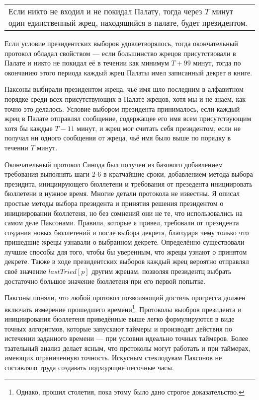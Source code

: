 \documentclass[12pt, a4paper]{article} %
\begin{document}
\begin{table}[h]
\begin{tabular}{p{11cm}}
    Если никто не входил и не покидал Палату, тогда через $T$ минут один единственный жрец, находящийся в палате, будет президентом.
\end{tabular}
\end{table}

Если условие президентских выборов удовлетворялось, тогда окончательный протокол обладал свойством --- если большинство жрецов присутствовали в Палате и никто не покидал её в течении как минимум $T + 99$ минут, тогда по окончанию этого периода каждый жрец Палаты имел записанный декрет в книге.

Паксоны выбирали президентом жреца, чьё имя шло последним в алфавитном порядке среди всех присутствующих в Палате жрецов, хотя мы и не знаем, как точно это делалось. Условие выбором президента принималось, если каждый жрец в Палате отправлял сообщение, содержащее его имя всем присутствующим хотя бы каждые $T - 11$ минут, и жрец мог считать себя президентом, если не получал ни одного сообщения от жреца, чьё имя было выше по порядку в течении $T$ минут.

Окончательный протокол Синода был получен из базового добавлением требования выполнять шаги 2-6 в кратчайшие сроки, добавлением метода выбора президнта, инициирующего бюллетени и требования от презедента инициировать бюллетени в нужное время. Многие детали протокола не известны. Я описал простые методы выбора президента и принятия решения президентом о инициировании бюллетеня, но без сомнений они не те, что использовались на самом деле Паксонами. Правила, которые я привел, требовали от президента создания новых бюллетений и после выбора декрета, благодаря чему только что пришедшие жрецы узнавали о выбранном декрете. Определённо существовали лучшие способы для того, чтобы бы уверенным, что жрецы узнают о принятом декрете. Также в ходе президентских выборов каждый жрец вероятно отправлял своё значение $lastTried[p]$  другим жрецам, позволяя президентц выбрать достаточно большое значение бюллетеня при его первой попытке.

Паксоны поняли, что любой протокол позволяющий достичь прогресса должен включать измерение прошедшего времени\footnote{Однако, прошил столетия, пока этому было дано строгое доказательство.}. Протоколы выобров президента и инициирования бюллетеня приведённые выше легко формулируются в виде точных алгоритмов, которые запускают таймеры и производят действия по истечении заданного времени --- при условии идеально точных таймеров. Более тзательный анализ делает ясным, что протоколы могут работать и при таймерах, имеющих ограниченную точность. Искусным стеклодувам Паксонов не составляло труда создавать подходящие песочные часы. 
\end{document}

